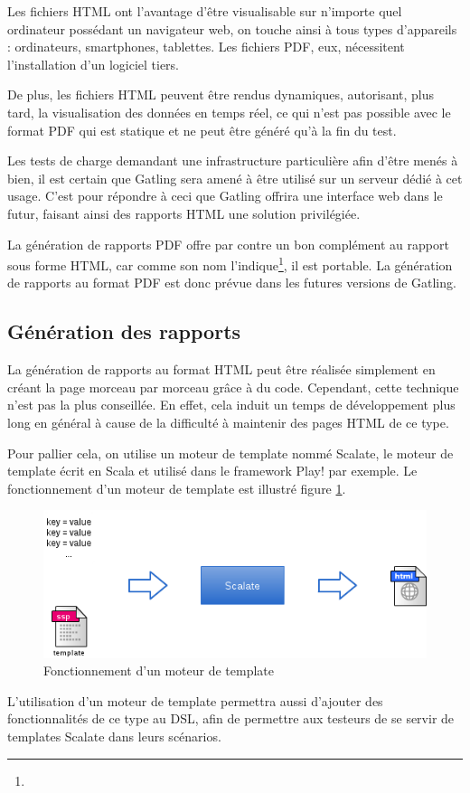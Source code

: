 Les fichiers HTML ont l'avantage d'être visualisable sur n'importe quel ordinateur possédant un navigateur web, on touche ainsi à tous types d'appareils : ordinateurs, smartphones, tablettes. Les fichiers PDF, eux, nécessitent l'installation d'un logiciel tiers.

De plus, les fichiers HTML peuvent être rendus dynamiques, autorisant, plus tard, la visualisation des données en temps réel, ce qui n'est pas possible avec le format PDF qui est statique et ne peut être généré qu'à la fin du test.

Les tests de charge demandant une infrastructure particulière afin d'être menés à bien, il est certain que Gatling sera amené à être utilisé sur un serveur dédié à cet usage. C'est pour répondre à ceci que Gatling offrira une interface web dans le futur, faisant ainsi des rapports HTML une solution privilégiée.

La génération de rapports PDF offre par contre un bon complément au rapport sous forme HTML, car comme son nom l'indique\footnote{}, il est portable. La génération de rapports au format PDF est donc prévue dans les futures versions de Gatling.

\subsection{Génération des rapports}
\label{sec_scalate}

La génération de rapports au format HTML peut être réalisée simplement en créant la page morceau par morceau grâce à du code. Cependant, cette technique n'est pas la plus conseillée. En effet, cela induit un temps de développement plus long en général à cause de la difficulté à maintenir des pages HTML de ce type.

Pour pallier cela, on utilise un moteur de template nommé Scalate\cite{www_scalate}, le moteur de template écrit en Scala et utilisé dans le framework Play! par exemple. Le fonctionnement d'un moteur de template est illustré figure \ref{scalate}.

\begin{figure}[h]
\begin{center}
\includegraphics[width=400pt]{img/scalate.png}
\end{center}
\caption{Fonctionnement d'un moteur de template}
\label{scalate}
\end{figure}

L'utilisation d'un moteur de template permettra aussi d'ajouter des fonctionnalités de ce type au DSL, afin de permettre aux testeurs de se servir de templates Scalate dans leurs scénarios.